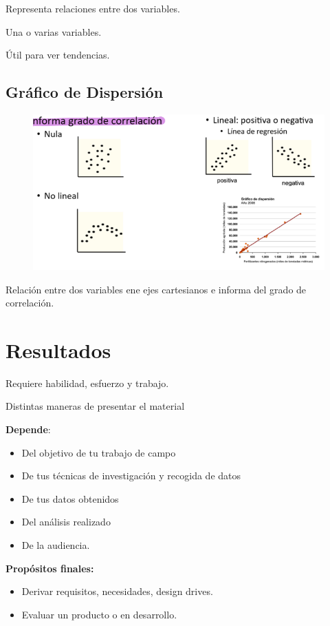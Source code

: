 \documentclass[12pt]{report} %
\begin{document}
Representa relaciones entre dos variables.

Una o varias variables.

Útil para ver tendencias.

\subsection{Gráfico de
Dispersión}

\begin{figure}[H]
	{\includegraphics[scale=.4]{Untitled 10.png}}
\end{figure}

Relación entre dos variables ene ejes cartesianos e informa del grado de
correlación.

\section{Resultados}

Requiere habilidad, esfuerzo y trabajo.

Distintas maneras de presentar el material

\textbf{Depende}:

\begin{itemize}
\item
  Del objetivo de tu trabajo de campo
\item
  De tus técnicas de investigación y recogida de datos
\item
  De tus datos obtenidos
\item
  Del análisis realizado
\item
  De la audiencia.
\end{itemize}

\textbf{Propósitos finales:}

\begin{itemize}
\item
  Derivar requisitos, necesidades, design drives.
\item
  Evaluar un producto o en desarrollo.
\end{itemize}
\end{document}
